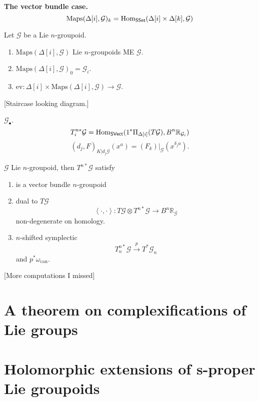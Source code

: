 \medskip\noindent
{\bf The vector bundle case.}
$$
\text{Maps}(\Delta[i],\mathcal{G})_k=
\mathop{\mathrm{Hom}}\nolimits_{\mathsf{SSet}}(\Delta[i]\times\Delta[k],\mathcal{G})
$$
\begin{proposition}
\label{proposition-on-an-n-Lie-groupoid}
Let $\mathcal{G}$ be a Lie $n$-groupoid.
\begin{enumerate}
\item $\text{Maps}(\Delta[i],\mathcal{G})$ Lie $n$-groupoids ME $\mathcal{G}$.
\item $\text{Maps}(\Delta[i],\mathcal{G})_0=\mathcal{G}_i$.
\item $\text{ev}:\Delta[i]\times \text{Maps}(\Delta[i],\mathcal{G})\to
\mathcal{G}$.
\end{enumerate}
\end{proposition}

[Staircase looking diagram.]

\begin{definition}
\label{definition-what-is-this}
$\mathcal{G}_\bullet$.
$$
T_i^{n*}\mathcal{G}=\mathop{\mathrm{Hom}}\nolimits_{\mathsf{SVect}}(1^*  \Pi_{\Delta[i]}(T\mathcal{G}),
B^n\mathbb{R}_{\mathcal{G}_i})
$$
$$
(d_j,F)_{K|d_j\mathcal{G}}(x^a)=(F_k)|_{\mathcal{G}}(x^{\delta_ja}).
$$
\end{definition}

\begin{proposition}
\label{proposition-properties-of-that}
$\mathcal{G}$ Lie $n$-groupoid, then $T^{n*}\mathcal{G}$ satisfy
\begin{enumerate}
\item is a vector bundle $n$-groupoid
\item dual to $T\mathcal{G}$
$$
\left<\cdot,\cdot\right>:T\mathcal{G} \otimes T^{n*}\mathcal{G}
\to B^n\mathbb{R}_{\mathcal{G}}
$$
non-degenerate on homology.
\item $n$-shifted symplectic
$$
T^{n*}_n\mathcal{G}\overset{p}{\to}T^*\mathcal{G}_n
$$
and $p^*\omega_{\text{can}}$.
\end{enumerate}
\end{proposition}

[More computations I missed]

\section{A theorem on complexifications of Lie groups}

\section{Holomorphic extensions of s-proper Lie groupoids}
\label{section-holomorphic-extensions-of-s-proper-Lie-groupoids}

